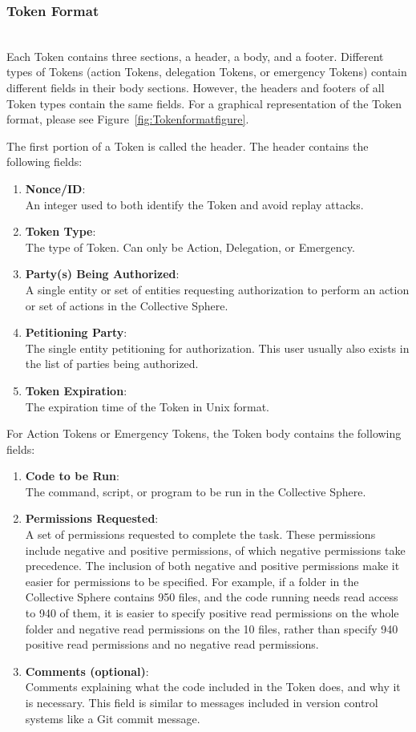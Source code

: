 \subsubsection{Token Format}
\label{sec:Tokenformat}
\mbox{}\\
Each Token contains three sections, a header, a body, and a footer. Different
types of Tokens (action Tokens, delegation Tokens, or emergency Tokens) contain
different fields in their body sections. However, the headers and footers of all
Token types contain the same fields. For a graphical representation of the Token
format, please see Figure~\ref{fig:Tokenformatfigure}.

The first portion of a Token is called the header. The header contains the
following fields:
\begin{enumerate}
\item \textbf{Nonce/ID}:\\ 
An integer used to both identify the Token and avoid replay attacks.
\item \textbf{Token Type}:\\ 
The type of Token. Can only be Action, Delegation, or Emergency.
\item \textbf{Party(s) Being Authorized}:\\
A single entity or set of entities requesting authorization to perform an action
or set of actions in the Collective Sphere.
\item \textbf{Petitioning Party}:\\
The single entity petitioning for authorization. This user usually also exists
in the list of parties being authorized.
\item \textbf{Token Expiration}:\\
The expiration time of the Token in Unix format.
\end{enumerate}

For Action Tokens or Emergency Tokens, the Token body contains the following
fields:
\begin{enumerate}
\item \textbf{Code to be Run}:\\
The command, script, or program to be run in the Collective Sphere.
\item \textbf{Permissions Requested}:\\
A set of permissions requested to complete the task. These permissions include
negative and positive permissions, of which negative permissions take
precedence. The inclusion of both negative and positive permissions make it
easier for permissions to be specified. For example, if a folder in the
Collective Sphere contains 950 files, and the code running needs read access to
940 of them, it is easier to specify positive read permissions on the whole
folder and negative read permissions on the 10 files, rather than specify 940
positive read permissions and no negative read permissions.
\item \textbf{Comments (optional)}:\\
Comments explaining what the code included in the Token does, and why it is
necessary. This field is similar to messages included in version control systems
like a Git commit message.
\end{enumerate}

